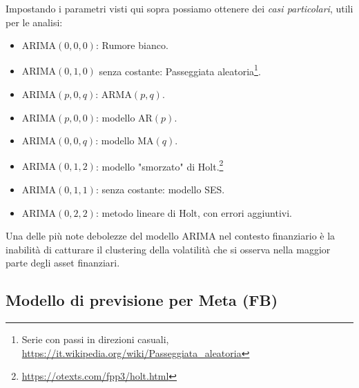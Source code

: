 Impostando i parametri visti qui sopra possiamo ottenere dei \emph{casi particolari}, utili per le analisi:

\begin{itemize}
    \item \(\text{ARIMA} (0,0,0)\): Rumore bianco.
    \item \(\text{ARIMA} (0,1,0)\) senza costante: Passeggiata 
    aleatoria\footnote{
        Serie con passi in direzioni casuali, \href{https://it.wikipedia.org/wiki/Passeggiata_aleatoria}{https://it.wikipedia.org/wiki/Passeggiata\_aleatoria}
    }.
    \item \(\text{ARIMA} (p,0,q)\): \(\text{ARMA} (p,q)\).
    \item \(\text{ARIMA} (p,0,0)\): modello \(\text{AR} (p)\).
    \item \(\text{ARIMA} (0,0,q)\): modello \(\text{MA} (q)\).
    \item \(\text{ARIMA} (0,1,2)\): modello "smorzato" di 
    Holt.\footnote[28]{
        \href{https://otexts.com/fpp3/holt.html}{https://otexts.com/fpp3/holt.html}
    }
    \item \(\text{ARIMA} (0,1,1)\): senza costante: modello SES.
    \item \(\text{ARIMA} (0,2,2)\): metodo lineare di Holt\footnotemark[28], con errori aggiuntivi.
\end{itemize}

Una delle più note debolezze del modello ARIMA nel contesto finanziario è la inabilità di catturare il clustering della volatilità
che si osserva nella maggior parte degli asset finanziari.

\subsection{Modello di previsione per Meta (FB)}